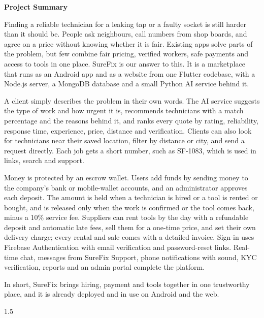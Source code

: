 \documentclass[A4paper,12pt]{report}
\theoremstyle{plain}
\theoremstyle{definition}
\renewcommand*\listfigurename{\par\hbox{LIST OF FIGURES \strut}\hrule height .05cm}
\renewcommand*\listtablename{\par\hbox{LIST OF TABLES \strut}\hrule height .05cm}
\theoremstyle{remark}
\numberwithin{equation}{section}
\begin{document}
\newpage
\begin{center}
\Large{\textbf{\textbf{Project Summary}}}\\
\end{center}
\setlength{\parindent}{0pt}
\normalsize{Finding a reliable technician for a leaking tap or a faulty socket is still harder than it should be. People ask neighbours, call numbers from shop boards, and agree on a price without knowing whether it is fair. Existing apps solve parts of the problem, but few combine fair pricing, verified workers, safe payments and access to tools in one place. SureFix is our answer to this. It is a marketplace that runs as an Android app and as a website from one Flutter codebase, with a Node.js server, a MongoDB database and a small Python AI service behind it.

A client simply describes the problem in their own words. The AI service suggests the type of work and how urgent it is, recommends technicians with a match percentage and the reasons behind it, and ranks every quote by rating, reliability, response time, experience, price, distance and verification. Clients can also look for technicians near their saved location, filter by distance or city, and send a request directly. Each job gets a short number, such as SF-1083, which is used in links, search and support.

Money is protected by an escrow wallet. Users add funds by sending money to the company's bank or mobile-wallet accounts, and an administrator approves each deposit. The amount is held when a technician is hired or a tool is rented or bought, and is released only when the work is confirmed or the tool comes back, minus a 10\% service fee. Suppliers can rent tools by the day with a refundable deposit and automatic late fees, sell them for a one-time price, and set their own delivery charge; every rental and sale comes with a detailed invoice. Sign-in uses Firebase Authentication with email verification and password-reset links. Real-time chat, messages from SureFix Support, phone notifications with sound, KYC verification, reports and an admin portal complete the platform.

In short, SureFix brings hiring, payment and tools together in one trustworthy place, and it is already deployed and in use on Android and the web.}

\begin{spacing}{1.5}
\newpage
\renewcommand{\cftaftertoctitle}{\hfill}
\renewcommand*\cftaftertoctitle{{\strut \hfill}\hrule height .05cm}

\!
\tableofcontents
\!

\!
\centering \renewcommand*\listfigurename{LIST OF FIGURES}
\renewcommand{\cftafterloftitle}{\hfill}
\renewcommand*\cftafterloftitle{{\strut \hfill}\hrule height .05cm}
\newpage
\listoffigures
\!
\clearpage
{\let\oldnumberline\numberline%
\renewcommand{\numberline}{\tablename~\oldnumberline}%
\centering \renewcommand*\listtablename{LIST OF TABLES}
\renewcommand{\cftafterlottitle}{\hfill}
\renewcommand*\cftafterlottitle{{\strut \hfill}\hrule height .05cm}
\listoftables}
\clearpage
\end{spacing}
\end{document}
